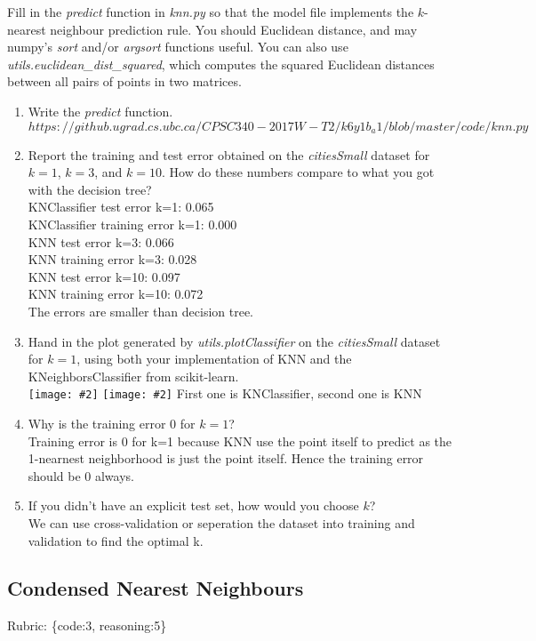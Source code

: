 \documentclass{article}
\def\blu#1{{\color{blu}#1}}
\def\gre#1{{\color{gre}#1}}
\newcommand{\fig}[2]{\texttt{[image: \#2]}}
\def\enum#1{\begin{enumerate}#1\end{enumerate}}
\def\rubric#1{\gre{Rubric: \{#1\}}}{}
\begin{document}
Fill in the \emph{predict} function in \emph{knn.py} so that the model file implements the $k$-nearest neighbour prediction rule.
You should Euclidean distance, and may numpy's \emph{sort} and/or \emph{argsort} functions useful.
You can also use \emph{utils.euclidean\_dist\_squared}, which computes the squared Euclidean distances between all pairs of points in two matrices.
\blu{
\enum{
\item Write the \emph{predict} function.\\
$https://github.ugrad.cs.ubc.ca/CPSC340-2017W-T2/k6y1b_a1/blob/master/code/knn.py$
\item Report  the training and test error obtained on the \emph{citiesSmall} dataset for $k=1$, $k=3$, and $k=10$. How do these numbers compare to what you got with the decision tree?\\
KNClassifier test error k=1: 0.065\\
KNClassifier training error k=1: 0.000\\
KNN test error k=3: 0.066\\
KNN training error k=3: 0.028\\
KNN test error k=10: 0.097\\
KNN training error k=10: 0.072\\
The errors are smaller than decision tree.\\
\item Hand in the plot generated by \emph{utils.plotClassifier} on the \emph{citiesSmall} dataset for $k=1$, using both your implementation of KNN and the KNeighborsClassifier from scikit-learn.\\
\fig{0.5}{../figs/q4_1_k1_KNClassifier}
\fig{0.5}{../figs/q4_1_k1_KNN}
First one is KNClassifier, second one is KNN
\item Why is the training error $0$ for $k=1$?\\
Training error is 0 for k=1 because  KNN use the point itself to predict as the 1-nearnest neighborhood is just the point itself. Hence the training error should be 0 always. 
\item If you didn't have an explicit test set, how would you choose $k$?\\
We can use cross-validation or seperation the dataset into training and validation to find the optimal k.
}}

\subsection{Condensed Nearest Neighbours}
\rubric{code:3, reasoning:5}
\end{document}

